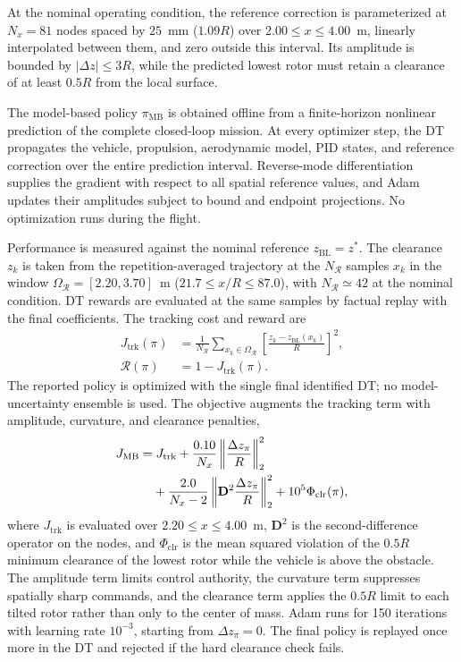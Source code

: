 \documentclass[journal]{IEEEtran}
\begin{document}
At the nominal operating condition, the reference correction is parameterized at $N_x=81$ nodes spaced by $25$~mm ($1.09R$) over $2.00\leq x\leq4.00$~m, linearly interpolated between them, and zero outside this interval. Its amplitude is bounded by $|\Delta z|\leq3R$, while the predicted lowest rotor must retain a clearance of at least $0.5R$ from the local surface.

The model-based policy $\pi_{\mathrm{MB}}$ is obtained offline from a finite-horizon nonlinear prediction of the complete closed-loop mission. At every optimizer step, the DT propagates the vehicle, propulsion, aerodynamic model, PID states, and reference correction over the entire prediction interval. Reverse-mode differentiation supplies the gradient with respect to all spatial reference values, and Adam updates their amplitudes subject to bound and endpoint projections. No optimization runs during the flight.

Performance is measured against the nominal reference $z_{\mathrm{BL}}=z^\ast$. The clearance $z_k$ is taken from the repetition-averaged trajectory at the $N_{\mathcal R}$ samples $x_k$ in the window $\Omega_{\mathcal R}=[2.20,3.70]$~m ($21.7\leq x/R\leq87.0$), with $N_{\mathcal R}\simeq42$ at the nominal condition. DT rewards are evaluated at the same samples by factual replay with the final coefficients. The tracking cost and reward are
\begin{equation}
 \begin{split}
 J_{\mathrm{trk}}(\pi)&=\frac{1}{N_{\mathcal R}}
 \sum_{x_k\in\Omega_{\mathcal R}}
 \left[\frac{z_k-z_{\mathrm{BL}}(x_k)}{R}\right]^2,\\
 \mathcal{R}(\pi)&=1-J_{\mathrm{trk}}(\pi).
 \end{split}
 \label{eq:reward}
\end{equation}
The reported policy is optimized with the single final identified DT; no model-uncertainty ensemble is used. The objective augments the tracking term with amplitude, curvature, and clearance penalties,
\begin{align}
 J_{\mathrm{MB}}=&\;J_{\mathrm{trk}}
 +\frac{0.10}{N_x}\left\|\frac{\Delta z_{\pi}}{R}\right\|_2^2 \notag\\
 &+\frac{2.0}{N_x-2}\left\|\mathbf{D}^2\frac{\Delta z_{\pi}}{R}\right\|_2^2
 +10^5\Phi_{\mathrm{clr}}(\pi),
 \label{eq:mb-objective}
\end{align}
where $J_{\mathrm{trk}}$ is evaluated over $2.20\leq x\leq4.00$~m, $\mathbf{D}^2$ is the second-difference operator on the nodes, and $\Phi_{\mathrm{clr}}$ is the mean squared violation of the $0.5R$ minimum clearance of the lowest rotor while the vehicle is above the obstacle. The amplitude term limits control authority, the curvature term suppresses spatially sharp commands, and the clearance term applies the $0.5R$ limit to each tilted rotor rather than only to the center of mass. Adam runs for 150 iterations with learning rate $10^{-3}$, starting from $\Delta z_{\pi}=0$. The final policy is replayed once more in the DT and rejected if the hard clearance check fails.
\end{document}
